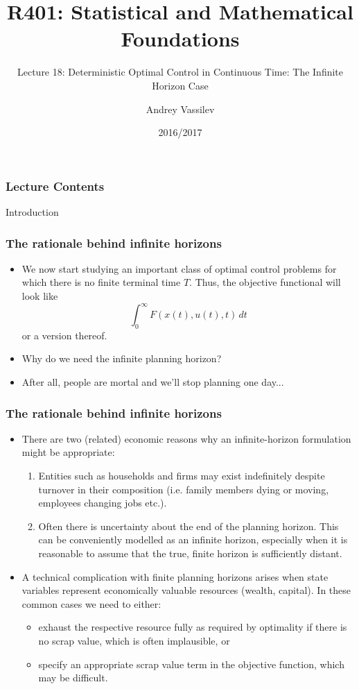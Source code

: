 \documentclass[10pt]{beamer}
\title{R401: Statistical and Mathematical Foundations}
\subtitle{Lecture 18: Deterministic Optimal Control in Continuous Time: The Infinite Horizon Case}
\author{Andrey Vassilev}
\date{2016/2017}
\theoremstyle{definition}
\begin{document}
\maketitle



\begin{frame}[fragile]
\frametitle{Lecture Contents}
\tableofcontents
\end{frame}

\begin{section}{Introduction}\label{sec:intro}

\begin{frame}[fragile]
\frametitle{The rationale behind infinite horizons}
\begin{itemize}\itemsep1em
\item We now start studying an important class of optimal control problems for which there is no finite terminal time $ T $. Thus, the objective functional will look like \[ \int_{0}^{\infty} F(x(t),u(t),t)\,dt \] or a version thereof.\pause
\item \alert{Why do we need the infinite planning horizon?}\pause
\item After all, people are mortal and we'll stop planning one day...
\end{itemize}
\end{frame}

\begin{frame}[fragile]
\frametitle{The rationale behind infinite horizons}
\begin{itemize}\itemsep1em
\item There are two (related) economic reasons why an infinite-horizon formulation might be appropriate:
\begin{enumerate}
\item Entities such as households and firms may exist indefinitely despite turnover in their composition (i.e. family members dying or moving, employees changing jobs etc.).
\item Often there is uncertainty about the end of the planning horizon. This can be conveniently modelled as an infinite horizon, especially when it is reasonable to assume that the true, finite horizon is sufficiently distant.
\end{enumerate}
\item A technical complication with finite planning horizons arises when state variables represent economically valuable resources (wealth, capital). In these common cases we need to either:
	\begin{itemize}
	\item exhaust the respective resource fully as required by optimality if there is no scrap value,  which is often implausible, or
	\item specify an appropriate scrap value term in the objective function, which may be difficult.
	\end{itemize}
\end{itemize}
\end{frame}


\end{section}
\end{document}
